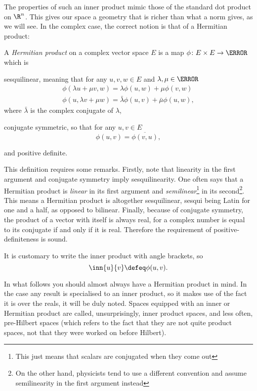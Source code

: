 \documentclass[12pt,oneside]{book}
\begin{document}
The properties of such an inner product mimic those of the standard dot product on \(
\R^n \). This gives our space a geometry that is richer than what a norm gives, as we will
see. In the complex case, the correct notion is that of a Hermitian product:
\begin{definition}
	A \emph{Hermitian product} on a complex vector space \( E \) is a map \( \phi \colon E
	\times E \to \C \) which is
	\begin{points}
	\item sesquilinear, meaning that for any \( u, v, w \in E \) and \( \lambda, \mu \in \C\)
		\begin{gather*}
			\phi(\lambda u + \mu v, w) = \lambda \phi(u,w) + \mu \phi(v,w) \\
			\phi(u, \lambda v + \mu w) = \bar{\lambda} \phi(u, v) + \bar{\mu} \phi(u,w),
		\end{gather*}
		where \( \bar{\lambda} \) is the complex conjugate of \( \lambda \),
	\item conjugate symmetric, so that for any \( u, v \in E \)
		\begin{equation}
			\phi(u,v) = \overline{\phi(v,u)},
		\end{equation}

	\item and positive definite.
	\end{points}
\end{definition}
This definition requires some remarks. Firstly, note that linearity in the first argument
and conjugate symmetry imply sesquilinearity. One often says that a Hermitian product is
\emph{linear} in its first argument and \emph{semilinear}\footnote{This just means that
scalars are conjugated when they come out} in its second\footnote{On the other hand,
physicists tend to use a different convention and assume semilinearity in the first
argument instead}. This means a Hermitian product is altogether sesquilinear, sesqui being
Latin for one and a half, as opposed to bilinear. Finally, because of conjugate
symmetry, the product of a vector with itself is always real, for a complex number is
equal to its conjugate if and only if it is real. Therefore the requirement of
positive-definiteness is sound.

It is customary to write the inner product with angle brackets, so
\begin{equation*}
	\inn{u}{v} \defeq \phi(u,v).
\end{equation*}

In what follows you should almost always have a Hermitian product in mind. In the case any
result is specialised to an inner product, so it makes use of the fact it is over the
reals, it will be duly noted. Spaces equipped with an inner or Hermitian product are called,
unsurprisingly, inner product spaces, and less often, pre-Hilbert spaces (which refers to
the fact that they are not quite product spaces, not that they were worked on before
Hilbert).
\end{document}
